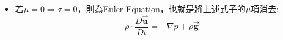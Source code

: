 \documentclass[../main.tex]{subfiles}
\begin{document}
\begin{itemize}
\begin{itemize}
\begin{align}
            + \frac{u_r u_{\phi} + u_{\theta}u_{\phi}\cot\theta}{r}
          \right) = \frac{-1}{r\sin\theta}\frac{\partial p}{\partial \phi} +\mu\left[
            \frac{1}{r^2}\frac{\partial}{\partial r}\left(r^2\frac{\partial u_{\phi}}{\partial r}\right)\right. \nonumber\\
          &\phantom{\rho}\vphantom{\left[\frac{1}{r^2}\frac{\partial^2}{\partial r^2}(r^2u_r)\right]}\left.
            + \frac{1}{r^2}\frac{\partial}{\partial \theta}\left(\frac{1}{\sin\theta}\frac{\partial}{\partial \theta}\left(u_\phi \sin\theta\right)\right)
            + \frac{1}{r^2\sin^2\theta}\frac{\partial^2 u_{\phi}}{\partial \phi^2}
            + \frac{2}{r^2\sin\theta}\frac{\partial u_r}{\partial \phi}
            + \frac{2\cot\theta}{r^2\sin\theta}\frac{\partial u_{\theta}}{\partial \phi}
          \right] + \rho g_{\phi} \label{eq:spherical_navier_stokes}
        \end{align}
    \end{itemize}
  \item 若$\mu=0\Rightarrow\tau=0$，則為Euler Equation，也就是將上述式子的$\mu$項消去:
    \begin{equation}
      \rho \cdot \frac{D\vec {\bm u}}{Dt} = -\nabla p + \rho \vec {\bm g}
    \end{equation}
\end{itemize}
\end{document}
